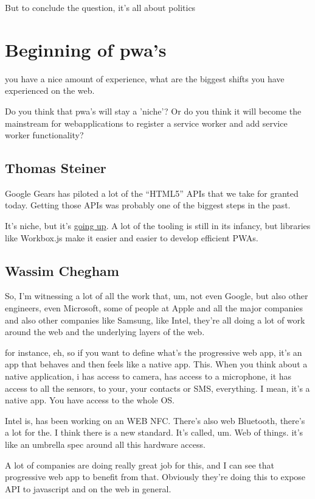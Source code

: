 			But to conclude the question, it's all about politics
		
	\section{Beginning of pwa's}
		you have a nice amount of experience, what are the biggest shifts you have experienced on the web. 
		
		Do you think that pwa's will stay a 'niche'? Or do you think it will become the mainstream for webapplications to register a service worker and add service worker functionality?
		\subsection{Thomas Steiner}
			Google Gears has piloted a lot of the “HTML5” APIs that we take for granted today. Getting those APIs was probably one of the biggest steps in the past.
			
			It’s niche, but it’s \href{https://httparchive.org/reports/progressive-web-apps#swControlledPages}{going up}. A lot of the tooling is still in its infancy, but libraries like Workbox.js make it easier and easier to develop efficient PWAs.
		
		\subsection{Wassim Chegham}
			So, I'm witnessing a lot of all the work that, um, not even Google, but also other engineers, even Microsoft, some of people at Apple and all the major companies and also other companies like Samsung, like Intel, they're all doing a lot of work around the web and the underlying layers of the web.
			
			for instance, eh, so if you want to define what's the progressive web app, it's an app that behaves and then feels like a native app. This. When you think about a native application, i has access to camera, has access to a microphone, it has access to all the sensors, to your, your contacts or SMS, everything. I mean, it's a native app. You have access to the whole OS.
			
			Intel is, has been working on an WEB NFC. There's also web Bluetooth, there's a lot for the. I think there is a new standard. It's called, um. Web of things. it's like an umbrella spec around all this hardware access.
			
			A lot of companies are doing really great job for this, and I can see that progressive web app to benefit from that. Obviously they're doing this to expose API to javascript and on the web in general. 
			
